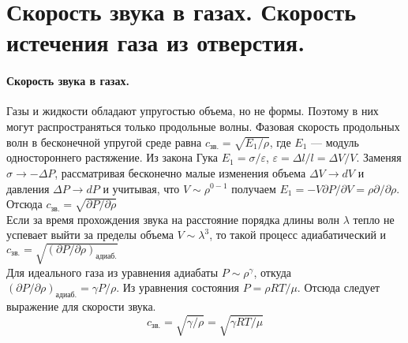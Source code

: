 \section{\normalsize Скорость звука в газах. Скорость истечения газа из отверстия.}
\paragraph{Скорость звука в газах.} Газы и жидкости обладают упругостью объема, но не формы. Поэтому в них могут распространяться только продольные волны. Фазовая скорость продольных волн в бесконечной упругой среде равна $c_\text{зв.}=\sqrt{E_1/\rho}$, где $E_1$ --- модуль одностороннего растяжение. Из закона Гука $E_1=\sigma/\varepsilon$, $\varepsilon=\Delta l/l=\Delta V/V$. Заменяя $\sigma \rightarrow -\Delta P$, рассматривая бесконечно малые изменения объема $\Delta V \rightarrow dV$ и давления $\Delta P \rightarrow dP$ и учитывая, что $V\sim\rho^{0-1}$ получаем $E_1=-V\partial P/\partial V=\rho \partial/\partial\rho$. Отсюда $c_\text{зв.}=\sqrt{\partial P/\partial\rho}$\\
Если за время прохождения звука на расстояние порядка длины волн $\lambda$ тепло не успевает выйти за пределы объема $V\sim\lambda^3$, то такой процесс адиабатический и $c_\text{зв.}=\sqrt{(\partial P/\partial\rho)_{\text{адиаб.}}}$\\
Для идеального газа из уравнения адиабаты $P\sim\rho^\gamma$, откуда $(\partial P/\partial\rho)_{\text{адиаб.}}=\gamma P/\rho$. Из уравнения состояния $P=\rho RT/\mu$. Отсюда следует выражение для скорости звука.
\[c_\text{зв.}=\sqrt{\gamma {/\rho}}=\sqrt{\gamma RT/\mu}  \]
